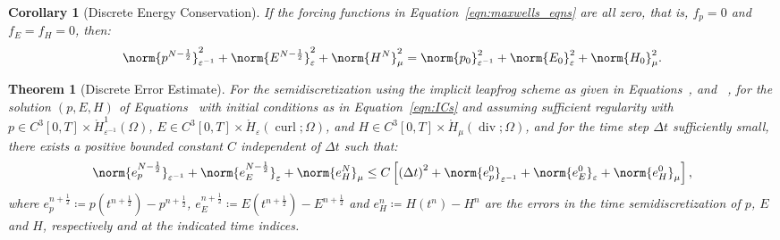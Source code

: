 \documentclass{amsart}
\theoremstyle{thmstyleone}%
\newtheorem{theorem}{Theorem}%
\theoremstyle{thmstyletwo}%
\theoremstyle{thmstylethree}%
\newtheorem{corollary}{Corollary}[theorem]
\DeclareMathOperator{\curl}{curl}
\def\divgn{\operatorname{div}}
\begin{document}
\begin{corollary}[Discrete Energy Conservation]\label{corr:dscrt_enrgy_cnsrvtn_lf}
If the forcing functions in Equation~\eqref{eqn:maxwells_eqns} are all zero, that is, $f_p = 0$ and $f_E = f_H = 0$, then:
\[
  \norm{p^{N - \frac{1}{2}}}^2_{\varepsilon^{-1}} + \norm{E^{N - \frac{1}{2}}}^2_{\varepsilon} + \norm{H^N}^2_{\mu} = \norm{p_0}^2_{\varepsilon^{-1}} + \norm{E_0}^2_{\varepsilon} + \norm{H_0}^2_{\mu}.
\]
\end{corollary}

\begin{theorem}[Discrete Error Estimate]\label{thm:dscrt_error_estmt_lf}
For the semidiscretization using the implicit leapfrog scheme as given in Equations~, and ~, for the solution $(p, E, H)$ of Equations~ with initial conditions as in Equation~\eqref{eqn:ICs} and assuming sufficient regularity with $p \in C^3[0, T] \times \mathring{H}^1_{\varepsilon^{-1}}(\Omega)$, $E \in C^3[0, T] \times \mathring{H}_{\varepsilon}(\curl; \Omega)$, and $H \in C^3[0, T] \times \mathring{H}_{\mu}(\divgn; \Omega)$, and for the time step $\Delta t$ sufficiently small, there exists a positive bounded constant $C$ independent of $\Delta t$ such that:
\[
  \norm{e_p^{N - \frac{1}{2}}}_{\varepsilon^{-1}} + \norm{e_E^{N - \frac{1}{2}}}_{\varepsilon} + \norm{e_H^N}_{\mu} \le C \left[ \left(\Delta t\right)^2 + \norm{e_p^0}_{\varepsilon^{-1}} + \norm{e_E^0}_{\varepsilon} + \norm{e_H^0}_{\mu} \right],
\]
where $e_p^{n + \frac{1}{2}} \coloneq p(t^{n + \frac{1}{2}}) - p^{n+\frac{1}{2}}$, $e_E^{n + \frac{1}{2}} \coloneq E(t^{n + \frac{1}{2}}) - E^{n + \frac{1}{2}}$ and $e_H^n \coloneq H(t^n) - H^n$ are the errors in the time semidiscretization of $p$, $E$ and $H$, respectively and at the indicated time indices.
\end{theorem}
\end{document}
